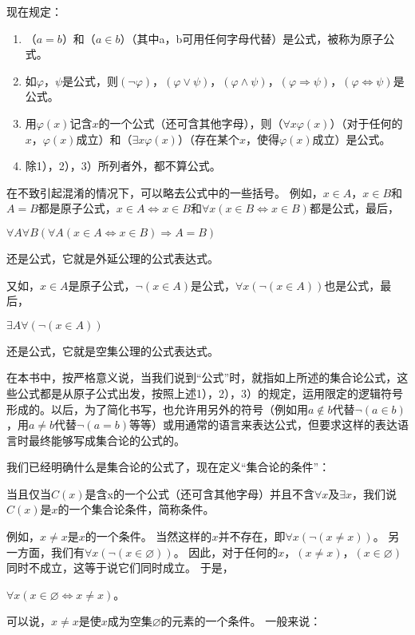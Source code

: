 现在规定：
\begin{enumerate}[label=\arabic*）]
\item （$a=b$）和（$a \in b$）（其中a，b可用任何字母代替）是公式，被称为原子公式。
\item 如$\varphi$，$\psi$是公式，则$(\neg \varphi)$，$(\varphi \lor \psi)$，$(\varphi \land \psi)$，$(\varphi \Rightarrow \psi)$，$(\varphi \Leftrightarrow \psi)$是公式。
\item 用$\varphi(x)$记含$x$的一个公式（还可含其他字母），则（$\forall x \varphi(x)$）（对于任何的$x$，$\varphi(x)$成立）和（$\exists x \varphi (x)$）（存在某个$x$，使得$\varphi (x)$成立）是公式。
\item 除1），2），3）所列者外，都不算公式。
\end{enumerate}

在不致引起混淆的情况下，可以略去公式中的一些括号。
例如，$x \in A$，$x \in B$和$A=B$都是原子公式，$x \in A \Leftrightarrow x \in B$和$\forall x (x \in B \Leftrightarrow x \in B)$都是公式，最后，
\begin{center}
$\forall A \forall B (\forall A (x \in A \Leftrightarrow x \in B) \Rightarrow A = B)$
\end{center}
还是公式，它就是外延公理的公式表达式。

又如，$x \in A$是原子公式，$\neg(x \in A)$是公式，$\forall x (\neg (x \in A))$也是公式，最后，
\begin{center}
$\exists A \forall (\neg (x \in A))$
\end{center}
还是公式，它就是空集公理的公式表达式。

在本书中，按严格意义说，当我们说到“公式”时，就指如上所述的集合论公式，这些公式都是从原子公式出发，按照上述1），2），3）的规定，运用限定的逻辑符号形成的。以后，为了简化书写，也允许用另外的符号（例如用$a \notin b$代替$\neg (a \in b)$，用$a \neq b$代替$\neg (a=b)$等等）或用通常的语言来表达公式，但要求这样的表达语言时最终能够写成集合论的公式的。

\hspace*{\fill}

我们已经明确什么是集合论的公式了，现在定义“集合论的条件”：

当且仅当$C(x)$是含x的一个公式（还可含其他字母）并且不含$\forall x$及$\exists x$，我们说$C(x)$是$x$的一个集合论条件，简称条件。

例如，$x \neq x$是$x$的一个条件。
当然这样的$x$并不存在，即$\forall x (\neg(x \neq x))$。
另一方面，我们有$\forall x (\neg(x \in \varnothing))$。
因此，对于任何的$x$，$(x \neq x)$，$(x \in \varnothing)$同时不成立，这等于说它们同时成立。
于是，
\begin{center}
$\forall x (x \in \varnothing \Leftrightarrow x \neq x)$。
\end{center}
可以说，$x \neq x$是使$x$成为空集$\varnothing$的元素的一个条件。
一般来说：

